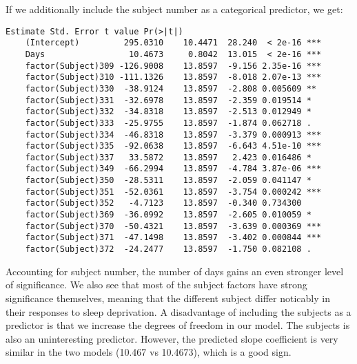 \documentclass[a4paper, twocolumn]{article}
\begin{document}
If we additionally include the subject number as a categorical predictor, we get:
\begin{Verbatim}[fontsize=\scriptsize]
                        Estimate Std. Error t value Pr(>|t|)    
    (Intercept)         295.0310    10.4471  28.240  < 2e-16 ***
    Days                 10.4673     0.8042  13.015  < 2e-16 ***
    factor(Subject)309 -126.9008    13.8597  -9.156 2.35e-16 ***
    factor(Subject)310 -111.1326    13.8597  -8.018 2.07e-13 ***
    factor(Subject)330  -38.9124    13.8597  -2.808 0.005609 ** 
    factor(Subject)331  -32.6978    13.8597  -2.359 0.019514 *  
    factor(Subject)332  -34.8318    13.8597  -2.513 0.012949 *  
    factor(Subject)333  -25.9755    13.8597  -1.874 0.062718 .  
    factor(Subject)334  -46.8318    13.8597  -3.379 0.000913 ***
    factor(Subject)335  -92.0638    13.8597  -6.643 4.51e-10 ***
    factor(Subject)337   33.5872    13.8597   2.423 0.016486 *  
    factor(Subject)349  -66.2994    13.8597  -4.784 3.87e-06 ***
    factor(Subject)350  -28.5311    13.8597  -2.059 0.041147 *  
    factor(Subject)351  -52.0361    13.8597  -3.754 0.000242 ***
    factor(Subject)352   -4.7123    13.8597  -0.340 0.734300    
    factor(Subject)369  -36.0992    13.8597  -2.605 0.010059 *  
    factor(Subject)370  -50.4321    13.8597  -3.639 0.000369 ***
    factor(Subject)371  -47.1498    13.8597  -3.402 0.000844 ***
    factor(Subject)372  -24.2477    13.8597  -1.750 0.082108 .  
\end{Verbatim}

Accounting for subject number, the number of days gains an even stronger level of significance. We also see that most of the subject factors have strong significance themselves, meaning that the different subject differ noticably in their responses to sleep deprivation. A disadvantage of including the subjects as a predictor is that we increase the degrees of freedom in our model. The subjects is also an uninteresting predictor. However, the predicted slope coefficient is very similar in the two models (10.467 vs 10.4673), which is a good sign.
\end{document}
